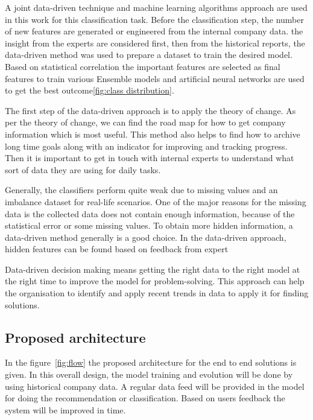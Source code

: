 

A joint data-driven technique and machine learning algorithms approach are used in this work for this classification task. Before the classification step, the number of new features are generated or engineered from the internal company data. the insight from the experts are considered first, then from the historical reports, the data-driven method was used to prepare a dataset to train the desired model. Based on statistical correlation the important features are selected as final features to train various Ensemble models and artificial neural networks are used to get the best outcome\ref{fig:class distribution}. 

The first step of the data-driven approach is to apply the theory of change. As per the theory of change, we can find the road map for how to get company information which is most useful. This method also helps to find how to archive long time goals along with an indicator for improving and tracking progress. Then it is important to get in touch with internal experts to understand what sort of data they are using for daily tasks.

Generally, the classifiers perform quite weak due to missing values and an imbalance dataset for real-life scenarios. One of the major reasons for the missing data is the collected data does not contain enough information, because of the statistical error or some missing values. To obtain more hidden information, a data-driven method generally is a good choice. In the data-driven approach, hidden features can be found based on feedback from expert

Data-driven decision making means getting the right data to the right model at the right time to improve the model for problem-solving. This approach can help the organisation to identify and apply recent trends in data to apply it for finding solutions.

\subsection{Proposed architecture}\label{subsec:propsed-architech}
In the figure~\ref{fig:flow} the proposed architecture for the end to end solutions is given. In this overall design, the model training and evolution will be done by using historical company data. A regular data feed will be provided in the model for doing the recommendation or classification. Based on users feedback the system will be improved in time. 

